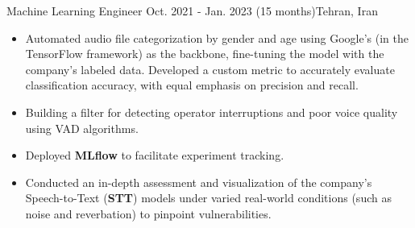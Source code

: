 \resumeSubheadingReza
{Machine Learning Engineer}{}
{Oct. 2021 - Jan. 2023 (15 months)}{Tehran, Iran}
{
  \vspace{-12pt}
  \begin{itemize}
    \item {Automated audio file categorization by gender and age using Google's  (in the TensorFlow framework) as the backbone, fine-tuning the model with the company's labeled data. Developed a custom metric to accurately evaluate classification accuracy, with equal emphasis on precision and recall.}
    \item {Building a filter for detecting operator interruptions and poor voice quality using VAD algorithms.}
    \item {Deployed \textbf{MLflow} to facilitate experiment tracking.}
    \item {Conducted an in-depth assessment and visualization of the company's Speech-to-Text (\textbf{STT}) models under varied real-world conditions (such as noise and reverbation) to pinpoint vulnerabilities.}
  \end{itemize}
}
  
